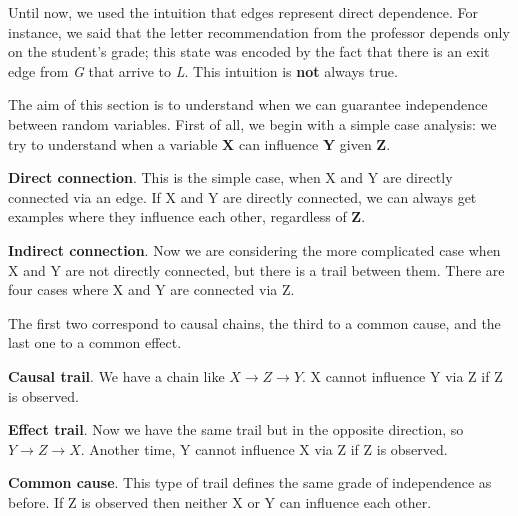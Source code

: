 Until now, we used the intuition that edges represent direct dependence. For instance, we said that the letter recommendation from the professor depends only on the student's grade;
this state was encoded by the fact that there is an exit edge from \textit{G} that arrive to \textit{L}. This intuition is \textbf{not} always true. \vspace{3.5pt}

The aim of this section is to understand when we can guarantee independence between random variables. First of all, we begin with a simple case analysis: we try to understand
when a variable \textbf{X} can influence \textbf{Y} given \textbf{Z}. \vspace{3.5pt}

\textbf{Direct connection}. This is the simple case, when X and Y are directly connected via an edge. If X and Y are directly connected, we can always get examples where they 
influence each other, regardless of \textbf{Z}. \vspace{3.5pt}

\textbf{Indirect connection}. Now  we are considering the more complicated case when X and Y are not directly connected, but there is a trail between them. There are four cases
where X and Y are connected via Z.
\begin{center}
\end{center}
The first two correspond to causal chains, the third to a common cause, and the last one to a common effect.

\textbf{Causal trail}. We have a chain like $X \rightarrow Z \rightarrow Y$. X cannot influence Y via Z if Z is observed.

\textbf{Effect trail}. Now we have the same trail but in the opposite direction, so  $Y \rightarrow Z \rightarrow X$. Another time, Y cannot influence X via Z if Z is observed.

\textbf{Common cause}. This type of trail defines the same grade of independence as before. If Z is observed then neither X or Y can influence each other. 


